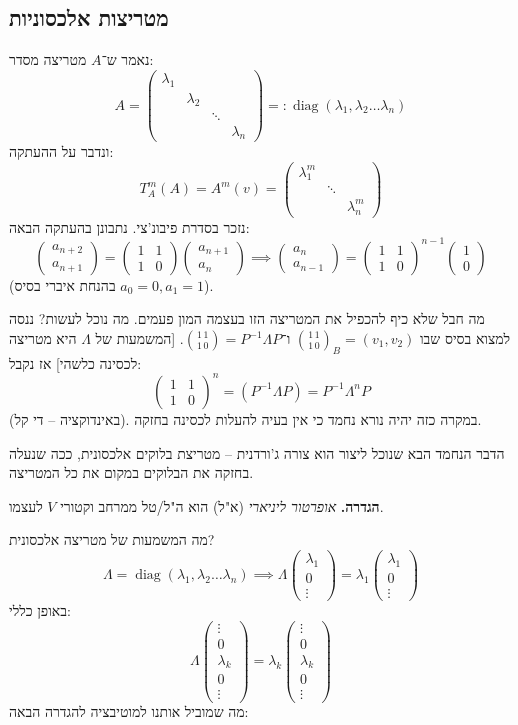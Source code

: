 \documentclass[]{article}
\DeclareMathOperator{\diag}    {diag}
\newcommand\pms[1]    {\begin{pmatrix}
		#1
\end{pmatrix}}
\renewcommand\lg      {\lambda}
\newcommand\op    {^{-1}}
\newcommand\cl [1]    {\left ( #1 \right )}
\theoremstyle{definition}
\begin{document}
	\subsection{מטריצות אלכסוניות}
	נאמר ש־$A$ מטריצה מסדר: 
	\[ A = \pms{\lg_1 & & &\\ &\lg_2 && \\ &&\ddots & \\ &&&\lg_n} =: \diag(\lg_1, \lg_2 \dots \lg_n) \]
	ונדבר על ההעתקה: 
	\[ T_A^m(A) = A^m(v) = \pms{\lg_1^m && \\ & \ddots & \\ &&\lg_n^m} \]
	נזכר בסדרת פיבונ'צי. נתבונן בהעתקה הבאה: 
	\[ \pms{a_{n + 2} \\ a_{n + 1}} = \pms{1 & 1 \\ 1 & 0}\pms{a_{n + 1} \\ a_n} \implies \pms{a_n \\ a_{n - 1}} = \pms{1 & 1 \\ 1 & 0}^{n - 1}\pms{1 \\ 0} \]
	(בהנחת איברי בסיס $a_0 = 0, a_1 = 1$). 
	
	מה חבל שלא כיף להכפיל את המטריצה הזו בעצמה המון פעמים. מה נוכל לעשות? ננסה למצוא בסיס שבו $\binom{1 \, 1}{1\, 0}_B = (v_1, v_2)$ ו־$\binom{1 \, 1}{1 \, 0} = P\op \Lambda P$. [המשמעות של $\Lambda$ היא מטריצה לכסינה כלשהי] אז נקבל: 
	\[ \pms{1 & 1 \\ 1 & 0}^{n} = \cl{P\op \Lambda P} = P\op\Lambda^nP \]
	(באינדוקציה – די קל). במקרה כזה יהיה נורא נחמד כי אין בעיה להעלות לכסינה בחזקה. 
	
	הדבר הנחמד הבא שנוכל ליצור הוא צורה ג'ורדנית – מטריצת בלוקים אלכסונית, ככה שנעלה בחזקה את הבלוקים במקום את כל המטריצה. 
	
	\textbf{הגדרה. }\textit{אופרטור ליניארי} (א"ל) הוא ה"ל/טל ממרחב וקטורי $V$ לעצמו. 
	
	מה המשמעות של מטריצה אלכסונית? 
	\[ \Lambda = \diag(\lg_1, \lg_2 \dots \lg_n) \implies \Lambda \pms{\lg_1 \\ 0 \\ \vdots} = \lg_1 \pms{\lg_1 \\ 0 \\ \vdots} \]
	באופן כללי: 
	\[ \Lambda \pms{\vdots \\ 0 \\ \lg_k \\ 0 \\ \vdots} = \lg_k \pms{\vdots \\ 0 \\ \lg_k \\ 0 \\ \vdots} \]
	מה שמוביל אותנו למוטיבציה להגדרה הבאה: 
	
\end{document}
